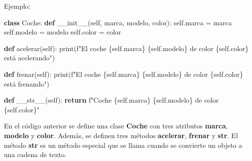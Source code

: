 \documentclass[
  a4paper,
  DIV=11,
  numbers=noendperiod,
  onepage,
  openany]{scrreprt}
\newenvironment{Shaded}{\begin{snugshade}}{\end{snugshade}}
\newcommand{\BuiltInTok}[1]{\textcolor[rgb]{0.00,0.23,0.31}{#1}}
\newcommand{\ControlFlowTok}[1]{\textcolor[rgb]{0.00,0.23,0.31}{\textbf{#1}}}
\newcommand{\FunctionTok}[1]{\textcolor[rgb]{0.28,0.35,0.67}{#1}}
\newcommand{\KeywordTok}[1]{\textcolor[rgb]{0.00,0.23,0.31}{\textbf{#1}}}
\newcommand{\NormalTok}[1]{\textcolor[rgb]{0.00,0.23,0.31}{#1}}
\newcommand{\OperatorTok}[1]{\textcolor[rgb]{0.37,0.37,0.37}{#1}}
\newcommand{\SpecialCharTok}[1]{\textcolor[rgb]{0.37,0.37,0.37}{#1}}
\newcommand{\SpecialStringTok}[1]{\textcolor[rgb]{0.13,0.47,0.30}{#1}}
\newcommand{\VariableTok}[1]{\textcolor[rgb]{0.07,0.07,0.07}{#1}}
\begin{document}
Ejemplo:

\begin{Shaded}
\begin{Highlighting}[]
\KeywordTok{class}\NormalTok{ Coche:}
    \KeywordTok{def} \FunctionTok{\_\_init\_\_}\NormalTok{(}\VariableTok{self}\NormalTok{, marca, modelo, color):}
        \VariableTok{self}\NormalTok{.marca }\OperatorTok{=}\NormalTok{ marca}
        \VariableTok{self}\NormalTok{.modelo }\OperatorTok{=}\NormalTok{ modelo}
        \VariableTok{self}\NormalTok{.color }\OperatorTok{=}\NormalTok{ color}

    \KeywordTok{def}\NormalTok{ acelerar(}\VariableTok{self}\NormalTok{):}
        \BuiltInTok{print}\NormalTok{(}\SpecialStringTok{f"El coche }\SpecialCharTok{\{}\VariableTok{self}\SpecialCharTok{.}\NormalTok{marca}\SpecialCharTok{\}}\SpecialStringTok{ }\SpecialCharTok{\{}\VariableTok{self}\SpecialCharTok{.}\NormalTok{modelo}\SpecialCharTok{\}}\SpecialStringTok{ de color }\SpecialCharTok{\{}\VariableTok{self}\SpecialCharTok{.}\NormalTok{color}\SpecialCharTok{\}}\SpecialStringTok{ está acelerando"}\NormalTok{)}

    \KeywordTok{def}\NormalTok{ frenar(}\VariableTok{self}\NormalTok{):}
        \BuiltInTok{print}\NormalTok{(}\SpecialStringTok{f"El coche }\SpecialCharTok{\{}\VariableTok{self}\SpecialCharTok{.}\NormalTok{marca}\SpecialCharTok{\}}\SpecialStringTok{ }\SpecialCharTok{\{}\VariableTok{self}\SpecialCharTok{.}\NormalTok{modelo}\SpecialCharTok{\}}\SpecialStringTok{ de color }\SpecialCharTok{\{}\VariableTok{self}\SpecialCharTok{.}\NormalTok{color}\SpecialCharTok{\}}\SpecialStringTok{ está frenando"}\NormalTok{)}

    \KeywordTok{def} \FunctionTok{\_\_str\_\_}\NormalTok{(}\VariableTok{self}\NormalTok{):}
        \ControlFlowTok{return} \SpecialStringTok{f"Coche }\SpecialCharTok{\{}\VariableTok{self}\SpecialCharTok{.}\NormalTok{marca}\SpecialCharTok{\}}\SpecialStringTok{ }\SpecialCharTok{\{}\VariableTok{self}\SpecialCharTok{.}\NormalTok{modelo}\SpecialCharTok{\}}\SpecialStringTok{ de color }\SpecialCharTok{\{}\VariableTok{self}\SpecialCharTok{.}\NormalTok{color}\SpecialCharTok{\}}\SpecialStringTok{"}
\end{Highlighting}
\end{Shaded}

En el código anterior se define una clase \textbf{Coche} con tres
atributos \textbf{marca}, \textbf{modelo} y \textbf{color}. Además, se
definen tres métodos \textbf{acelerar}, \textbf{frenar} y
\textbf{\textbf{str}}. El método \textbf{\textbf{str}} es un método
especial que se llama cuando se convierte un objeto a una cadena de
texto.
\end{document}
